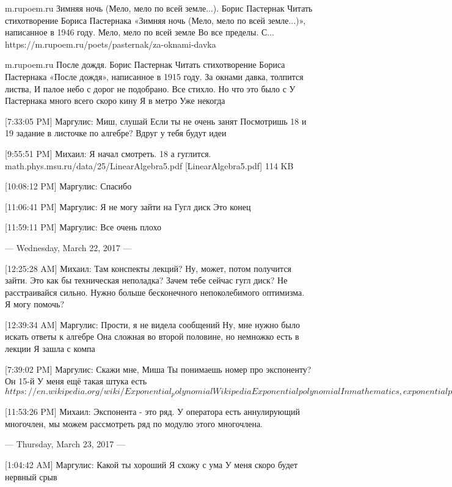 \documentclass{article}
\begin{document}
m.rupoem.ru
Зимняя ночь (Мело, мело по всей земле...). Борис Пастернак
Читать стихотворение Бориса Пастернака «Зимняя ночь (Мело, мело по всей земле...)», написанное в 1946 году. Мело, мело по всей земле Во все пределы. С...
 https://m.rupoem.ru/poets/pasternak/za-oknami-davka

m.rupoem.ru
После дождя. Борис Пастернак
Читать стихотворение Бориса Пастернака «После дождя», написанное в 1915 году. За окнами давка, толпится листва, И палое небо с дорог не подобрано. Все стихло. Но что это было с
 У Пастернака много всего скоро кину
 Я в метро
 Уже некогда

[7:33:05 PM] Маргулис:
Миш, слушай
 Если ты не очень занят
 Посмотришь 18 и 19 задание в листочке по алгебре? Вдруг у тебя будут идеи

[9:55:51 PM] Михаил:
Я начал смотреть.
 18 а гуглится. math.phys.msu.ru/data/25/LinearAlgebra5.pdf
[LinearAlgebra5.pdf] 114 KB
 
[10:08:12 PM] Маргулис:
Спасибо

[11:06:41 PM] Маргулис:
Я не могу зайти на Гугл диск
 Это конец

[11:59:11 PM] Маргулис:
Все очень плохо

--- Wednesday, March 22, 2017 ---

[12:25:28 AM] Михаил:
Там конспекты лекций?
 Ну, может, потом получится зайти. Это как бы техническая неполадка? Зачем тебе сейчас гугл диск?
 Не расстраивайся сильно. Нужно больше бесконечного непоколебимого оптимизма.
 Я могу помочь?

[12:39:34 AM] Маргулис:
Прости, я не видела сообщений
 Ну, мне нужно было искать ответы к алгебре
 Она сложная во второй половине, но немножко есть в лекции
 Я зашла с компа

[7:39:02 PM] Маргулис:
Скажи мне, Миша
 Ты понимаешь номер про экспоненту?
 Он 15-й
 У меня ещё такая штука есть
 $https://en.wikipedia.org/wiki/Exponential_polynomial
Wikipedia
Exponential polynomial
In mathematics, exponential polynomials are functions on fields, rings, or abelian groups that take the form of polynomials in a variable and an exponential function.$

[11:53:26 PM] Михаил:
Экспонента - это ряд. У оператора есть аннулирующий многочлен, мы можем рассмотреть ряд по модулю этого многочлена.

--- Thursday, March 23, 2017 ---

[1:04:42 AM] Маргулис:
Какой ты хороший
 Я схожу с ума
 У меня скоро будет нервный срыв
\end{document}
